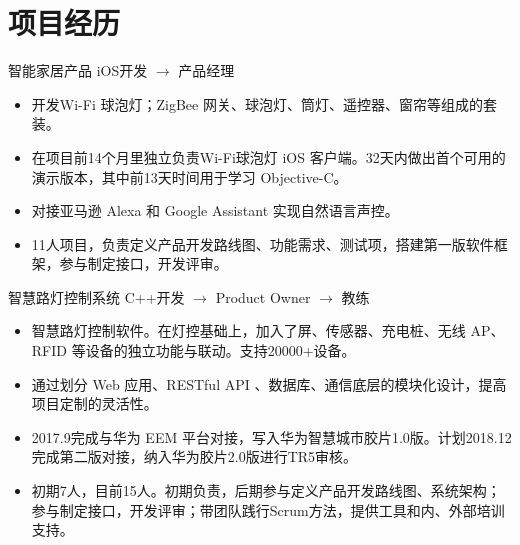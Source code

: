 \documentclass[11pt,a4paper]{moderncv/moderncv}
\begin{document}



\section{项目经历}

{智能家居产品}
{iOS开发 $\rightarrow$ 产品经理}
{}{}
{
\begin{itemize}
	\item 开发Wi-Fi 球泡灯；ZigBee 网关、球泡灯、筒灯、遥控器、窗帘等组成的套装。
	\item 在项目前14个月里独立负责Wi-Fi球泡灯 iOS 客户端。32天内做出首个可用的演示版本，其中前13天时间用于学习 Objective-C。
	\item 对接亚马逊 Alexa 和 Google Assistant 实现自然语言声控。
	\item 11人项目，负责定义产品开发路线图、功能需求、测试项，搭建第一版软件框架，参与制定接口，开发评审。
\end{itemize}
}

{智慧路灯控制系统}
{C++开发 $\rightarrow$ Product Owner $\rightarrow$ 教练}
{}{}
{
\begin{itemize}
	\item 智慧路灯控制软件。在灯控基础上，加入了屏、传感器、充电桩、无线 AP、RFID 等设备的独立功能与联动。支持20000+设备。
	\item 通过划分 Web 应用、RESTful API 、数据库、通信底层的模块化设计，提高项目定制的灵活性。
	\item 2017.9完成与华为 EEM 平台对接，写入华为智慧城市胶片1.0版。计划2018.12完成第二版对接，纳入华为胶片2.0版进行TR5审核。
	\item 初期7人，目前15人。初期负责，后期参与定义产品开发路线图、系统架构；参与制定接口，开发评审；带团队践行Scrum方法，提供工具和内、外部培训支持。
\end{itemize}
}
\end{document}
